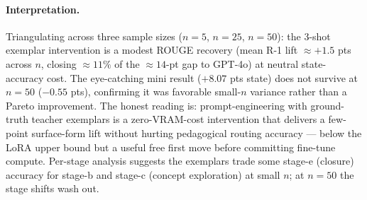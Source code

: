 \documentclass[11pt]{article}
\begin{document}
\begin{table}[t]
  \centering
  \small
  \caption{ROUGE recovery via 3-shot teacher exemplars on Qwen 35B-A3B fusion-think, across three sample sizes. The $n{=}25$ mini showed a $+8.07$-pt state-accuracy lift; the $n{=}50$ matched-pair (think vs.\ +exemplars-think) shows $-0.55$ pts state, $+0.46$ R-1 --- consistent with the mini's lift being favorable small-$n$ variance. The robust signal across all three scales is the ROUGE-1 lift ($+1.00$ smoke, $+2.98$ mini, $+0.46$ at $n{=}50$), suggesting the exemplars deliver modest surface-form improvement at neutral-to-positive state-acc cost rather than a Pareto win. The exemplars add $\approx 360$ characters of prompt overhead and zero additional inference VRAM.}
  \label{tab:rouge-recovery}
\end{table}

\paragraph{Interpretation.} Triangulating across three sample sizes ($n{=}5$, $n{=}25$, $n{=}50$): the 3-shot exemplar intervention is a modest ROUGE recovery (mean R-1 lift $\approx +1.5$ pts across $n$, closing $\approx 11\%$ of the $\approx 14$-pt gap to GPT-4o) at neutral state-accuracy cost. The eye-catching mini result ($+8.07$ pts state) does not survive at $n{=}50$ ($-0.55$ pts), confirming it was favorable small-$n$ variance rather than a Pareto improvement. The honest reading is: prompt-engineering with ground-truth teacher exemplars is a zero-VRAM-cost intervention that delivers a few-point surface-form lift without hurting pedagogical routing accuracy --- below the LoRA upper bound but a useful free first move before committing fine-tune compute. Per-stage analysis suggests the exemplars trade some stage-e (closure) accuracy for stage-b and stage-c (concept exploration) at small $n$; at $n{=}50$ the stage shifts wash out.
\end{document}
